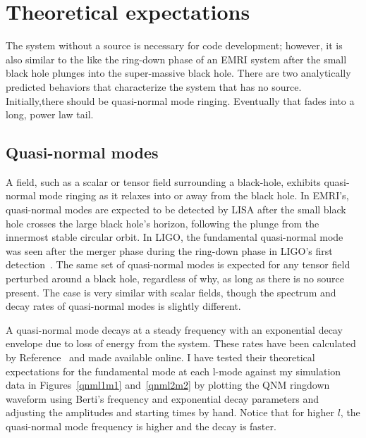   



\section{Theoretical expectations}

The system without a source is necessary for code development; however, it is also similar to the like the ring-down phase of an EMRI system after the small black hole plunges into the super-massive black hole. There are two analytically predicted behaviors that characterize the system that has no source. Initially,there should be quasi-normal mode ringing. Eventually that fades into a long, power law tail. 

\subsection{Quasi-normal modes}
A field, such as a scalar or tensor field surrounding a black-hole, exhibits quasi-normal mode ringing as it relaxes into or away from the black hole.  
In EMRI's, quasi-normal modes are expected to be detected by LISA after the small black hole crosses the large black hole's horizon, following the plunge from the innermost stable circular orbit. In LIGO, the fundamental quasi-normal mode was seen after the merger phase during the ring-down phase in LIGO's first detection~\cite{LIGO1e}. The same set of quasi-normal modes is expected for any tensor field perturbed around a black hole, regardless of why, as long as there is no source present. The case is very similar with scalar fields, though the spectrum and decay rates of quasi-normal modes is slightly different.

A quasi-normal mode decays at a steady frequency with an exponential decay envelope due to loss of energy from the system. These rates have been calculated by Reference~\cite{bertiSchwQNM} and made available online. I have tested their theoretical expectations for the fundamental mode at each l-mode against my simulation data in Figures~\ref{qnml1m1} and~\ref{qnml2m2} by plotting the QNM ringdown waveform using Berti's frequency and exponential decay parameters and adjusting the amplitudes and starting times by hand. Notice that for higher $l$, the quasi-normal mode frequency is higher and the decay is faster.

